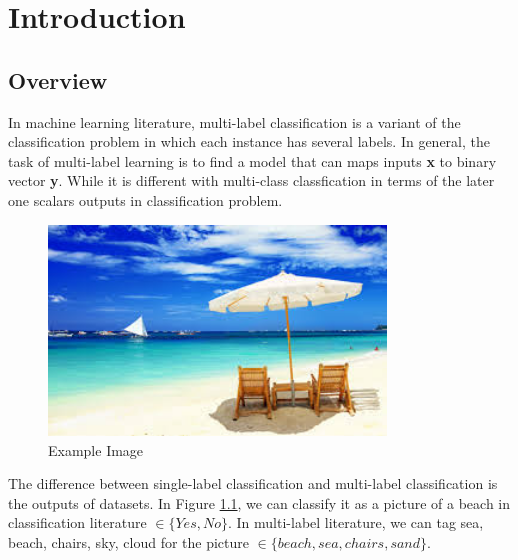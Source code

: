 
\chapter{Introduction} %
\label{Chapter5}

\section{Overview}

In machine learning literature, multi-label classification is a variant of the classification problem in which each instance has several labels. In general, the task of multi-label learning is to find a model that can maps inputs \textbf{x} to binary vector \textbf{y}. While it is different with multi-class classfication in terms of the later one scalars outputs in classification problem.

\graphicspath{ {./Figures/} }
\begin{figure}[!htb]
    \centering
	\includegraphics[width=0.8\textwidth]{beach.jpg}
    \caption{Example Image}%
    \label{fig:MultilableImage}%
\end{figure}

The difference between single-label classification and multi-label classification is the outputs of datasets.
In Figure \ref{fig:MultilableImage}, we can classify it as a picture of a beach in classification literature $\in \{Yes, No\}$. In multi-label literature, we can tag sea, beach, chairs, sky, cloud for the picture $\in \{beach, sea, chairs, sand\}$.

